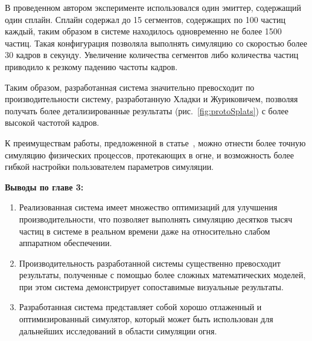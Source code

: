 В проведенном автором эксперименте использовался один эмиттер, содержащий один
сплайн. Сплайн содержал до 15 сегментов, содержащих по 100 частиц каждый, таким
образом в системе находилось одновременно не более 1500 частиц. Такая
конфигурация позволяла выполнять симуляцию со скоростью более 30 кадров в
секунду. Увеличение количества сегментов либо количества частиц приводило к
резкому падению частоты кадров.

Таким образом, разработанная система значительно превосходит по
производительности систему, разработанную Хладки и Журиковичем, позволяя
получать более детализированные результаты (рис.~\ref{fig:protoSplats}) с более
высокой частотой кадров.

К преимуществам работы, предложенной в статье~\cite{turbulence}, можно отнести
более точную симуляцию физических процессов, протекающих в огне, и возможность
более гибкой настройки пользователем параметров симуляции.

\textbf{Выводы по главе 3:}
\begin{enumerate}
    \item Реализованная система имеет множество оптимизаций для улучшения
        производительности, что позволяет выполнять симуляцию десятков тысяч
        частиц в системе в реальном времени даже на относительно слабом
        аппаратном обеспечении.
    \item Производительность разработанной системы существенно превосходит результаты,
        полученные с помощью более сложных математических моделей, при этом
        система демонстрирует сопоставимые визуальные результаты.
    \item Разработанная система представляет собой хорошо отлаженный и
        оптимизированный симулятор, который может быть использован для
        дальнейших исследований в области симуляции огня.
\end{enumerate}
